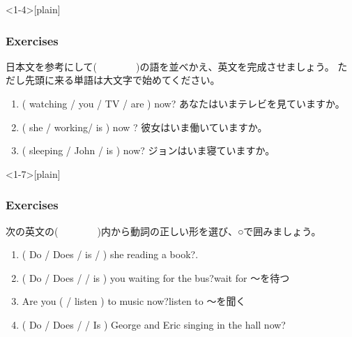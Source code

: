 \documentclass[aspectratio=169,xcolor={dvipsnames,table}]{beamer}
\newcommand{\myaudio}[1]{\href{#1}{\faVolumeUp}}
\begin{document}
\begin{frame}<1-4>[plain]\frametitle{Exercises}

日本文を参考にして(~~~~~~~~)の語を並べかえ、英文を完成させましょう。
ただし先頭に来る単語は大文字で始めてください。



\begin{enumerate}
 \item  ( watching /  you  / TV / are ) now?\hfill%
あなたはいまテレビを見ていますか。\\
 \item ( she / working/ is ) now ?
\hspace{5.3\zw}彼女はいま働いていますか。\\
 \item ( sleeping / John / is ) now?\hspace{4.8\zw}%
ジョンはいま寝ていますか。\\
\end{enumerate}

\mbox{}\hfill{\myaudio{./audio/023_is_ing_question_02.mp3}}
\end{frame}


\begin{frame}<1-7>[plain]\frametitle{Exercises}

次の英文の(~~~~~~~~)内から動詞の正しい形を選び、○で囲みましょう。

\begin{enumerate}
 \item ( Do / Does / is /  ) she reading a book?.\hspace{10pt}\raisebox{0pt}{\bcbook}
 \item ( Do / Does /  / is ) you waiting for the bus?\hspace{10pt}\hfill{\scriptsize wait for ～を待つ}
 \item Are you (  / listen ) to music now?\hfill{\scriptsize listen to ～を聞く}\\
\hfill{}
  \item ( Do / Does /  / Is ) George and Eric singing in the hall now?\hspace{10pt}\\
\hfill{}
\end{enumerate}
\pause

\vfill


\mbox{}\hfill{\myaudio{./audio/023_is_ing_question_03.mp3}}


\end{frame}
\end{document}
